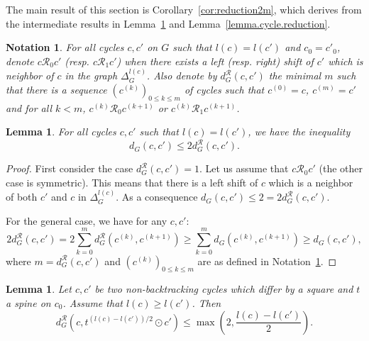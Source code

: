\documentclass{article}
\newtheorem{lemma}[theorem]{Lemma}
\newtheorem{notation}[theorem]{Notation}
\begin{document}
The main result of this section is Corollary~\ref{cor:reduction2m}, which derives from the intermediate results in Lemma~\ref{lemma.small.steps} and Lemma~\ref{lemma.cycle.reduction}.

\begin{notation}\label{notation.distance.R}
For all cycles $c,c'$ on $G$ such that $l(c) = l(c')$ and $c_0 = c'_0$, denote $c \mathcal{R}_0 c'$ (resp. $c \mathcal{R}_1 c'$) when there exists a left (resp. right) shift of $c'$ which is neighbor of $c$ in the graph $\Delta_G^{l(c)}$. 
Also denote by $d_G^{\mathcal{R}}(c,c')$ the minimal $m$ such that there is a sequence $(c^{(k)})_{0 \le k \le m}$ of cycles such that $c^{(0)} = c$, $c^{(m)}=c'$ and for all $k < m$, $c^{(k)} \mathcal{R}_0 c^{(k+1)}$ or $c^{(k)} \mathcal{R}_1 c^{(k+1)}$.  
\end{notation}

\begin{lemma}\label{lem:comp-distances}
For all cycles $c,c'$ such that $l(c)=l(c')$, we have the inequality 
\[d_G(c,c') \le 2 d_G^{\mathcal{R}}(c,c').\]
\end{lemma}

\begin{proof}
First consider the case $d_G^{\mathcal{R}}(c,c') = 1$. Let us assume that $c \mathcal{R}_0 c'$ (the other case is symmetric). This means that there is a left shift of $c$ which is a neighbor of both $c'$ and $c$ in $\Delta_G^{l(c)}$. As a consequence $d_G(c,c') \le 2 = 2 d_G^{\mathcal{R}}(c,c')$.

For the general case, we have for any $c,c'$:
\[
2 d_G^{\mathcal{R}}(c,c') = 2 \sum_{k=0}^m d_G^{\mathcal{R}}(c^{(k)},c^{(k+1)}) \ge \sum_{k=0}^m d_G(c^{(k)},c^{(k+1)}) \ge d_G(c,c'), 
\]
where $m= d_G^{\mathcal{R}}(c,c')$ and $(c^{(k)})_{0 \le k \le m}$ are as defined in Notation~\ref{notation.distance.R}.
\end{proof}

\begin{lemma}\label{lemma.small.steps}
Let $c,c'$ be two non-backtracking cycles which differ by a square and $t$ a spine on $c_0$. Assume that $l(c) \ge l(c')$. Then
\[d^{\mathcal{R}}_G(c, t^{(l(c)-l(c'))/2} \odot c') \le \max \left(2, \frac{l(c)-l(c')}{2}\right).\]
\end{lemma}
\end{document}
